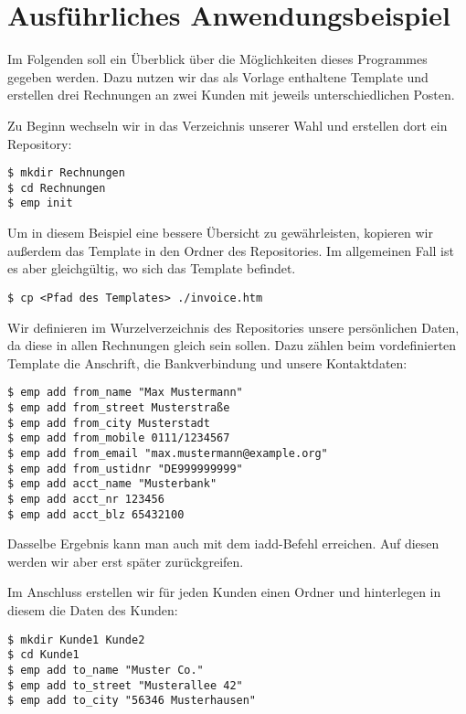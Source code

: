 

\section{Ausführliches Anwendungsbeispiel}
Im Folgenden soll ein Überblick über die Möglichkeiten dieses Programmes gegeben werden. Dazu nutzen wir das als Vorlage enthaltene Template und erstellen drei Rechnungen an zwei Kunden mit jeweils unterschiedlichen Posten.

Zu Beginn wechseln wir in das Verzeichnis unserer Wahl und erstellen dort ein Repository:
\begin{lstlisting}[style=Bash]
$ mkdir Rechnungen
$ cd Rechnungen
$ emp init
\end{lstlisting}

Um in diesem Beispiel eine bessere Übersicht zu gewährleisten, kopieren wir außerdem das Template in den Ordner des Repositories. Im allgemeinen Fall ist es aber gleichgültig, wo sich das Template befindet.
\begin{lstlisting}[style=Bash]
$ cp <Pfad des Templates> ./invoice.htm
\end{lstlisting}


Wir definieren im Wurzelverzeichnis des Repositories unsere persönlichen Daten, da diese in allen Rechnungen gleich sein sollen. Dazu zählen beim vordefinierten Template die Anschrift, die Bankverbindung und unsere Kontaktdaten:

\begin{lstlisting}[style=Bash]
$ emp add from_name "Max Mustermann"
$ emp add from_street Musterstraße
$ emp add from_city Musterstadt
$ emp add from_mobile 0111/1234567
$ emp add from_email "max.mustermann@example.org"
$ emp add from_ustidnr "DE999999999"
$ emp add acct_name "Musterbank"
$ emp add acct_nr 123456
$ emp add acct_blz 65432100
\end{lstlisting}

Dasselbe Ergebnis kann man auch mit dem iadd-Befehl erreichen. Auf diesen werden wir aber erst später zurückgreifen.


Im Anschluss erstellen wir für jeden Kunden einen Ordner und hinterlegen in diesem die Daten des Kunden:
\begin{lstlisting}[style=Bash]
$ mkdir Kunde1 Kunde2
$ cd Kunde1
$ emp add to_name "Muster Co."
$ emp add to_street "Musterallee 42"
$ emp add to_city "56346 Musterhausen"
\end{lstlisting}

